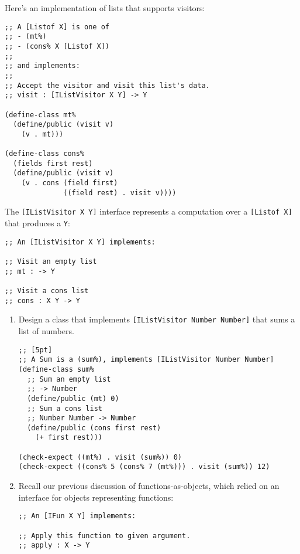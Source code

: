 \documentclass[12pt]{article}                   %
\def\pts#1{\marginpar{\footnotesize \raggedright  \fbox{#1 {\sc Points}}}}
\newenvironment{solution}{}{}
\begin{document}
\newpage
\begin{problem}\pts{11}

Here's an implementation of lists that supports visitors:

\begin{verbatim}
;; A [Listof X] is one of
;; - (mt%)
;; - (cons% X [Listof X])
;;
;; and implements:
;;
;; Accept the visitor and visit this list's data.
;; visit : [IListVisitor X Y] -> Y 

(define-class mt%
  (define/public (visit v)
    (v . mt)))

(define-class cons%
  (fields first rest)
  (define/public (visit v)
    (v . cons (field first) 
              ((field rest) . visit v))))
\end{verbatim}
%
The \verb|[IListVisitor X Y]| interface represents a computation over
a \verb|[Listof X]| that produces a \verb|Y|:
\begin{verbatim}
;; An [IListVisitor X Y] implements:

;; Visit an empty list
;; mt : -> Y

;; Visit a cons list
;; cons : X Y -> Y
\end{verbatim}

\newpage
\begin{enumerate}

\item Design a class that implements
  \verb|[IListVisitor Number Number]| that sums a list of numbers.

\begin{solution}
\begin{verbatim}
;; [5pt]
;; A Sum is a (sum%), implements [IListVisitor Number Number]
(define-class sum%
  ;; Sum an empty list
  ;; -> Number
  (define/public (mt) 0)
  ;; Sum a cons list
  ;; Number Number -> Number
  (define/public (cons first rest)
    (+ first rest)))

(check-expect ((mt%) . visit (sum%)) 0)
(check-expect ((cons% 5 (cons% 7 (mt%))) . visit (sum%)) 12)
\end{verbatim}
\end{solution}

\newpage

\item Recall our previous discussion of functions-as-objects, which relied on an interface for objects representing functions:

\begin{verbatim}
;; An [IFun X Y] implements:

;; Apply this function to given argument.
;; apply : X -> Y
\end{verbatim}


\end{enumerate}
\end{problem}
\end{document}
